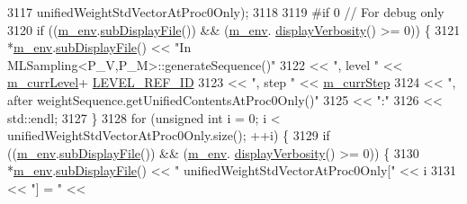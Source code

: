 \begin{DoxyCode}
3117                                                    unifiedWeightStdVectorAtProc0Only);
3118 
3119 \textcolor{preprocessor}{#if 0 // For debug only}
3120 \textcolor{preprocessor}{}      \textcolor{keywordflow}{if} ((\hyperlink{class_q_u_e_s_o_1_1_m_l_sampling_a13f1ca4fe9f94822fe572a743eaced1d}{m\_env}.\hyperlink{class_q_u_e_s_o_1_1_base_environment_a8a0064746ae8dddfece4229b9ad374d6}{subDisplayFile}()) && (\hyperlink{class_q_u_e_s_o_1_1_m_l_sampling_a13f1ca4fe9f94822fe572a743eaced1d}{m\_env}.
      \hyperlink{class_q_u_e_s_o_1_1_base_environment_a1fe5f244fc0316a0ab3e37463f108b96}{displayVerbosity}() >= 0)) \{
3121         *\hyperlink{class_q_u_e_s_o_1_1_m_l_sampling_a13f1ca4fe9f94822fe572a743eaced1d}{m\_env}.\hyperlink{class_q_u_e_s_o_1_1_base_environment_a8a0064746ae8dddfece4229b9ad374d6}{subDisplayFile}() << \textcolor{stringliteral}{"In MLSampling<P\_V,P\_M>::generateSequence()"}
3122                                 << \textcolor{stringliteral}{", level "} << \hyperlink{class_q_u_e_s_o_1_1_m_l_sampling_af9416874c856e50f3b35270e801f17e4}{m\_currLevel}+
      \hyperlink{_m_l_sampling_level_options_8h_a68d15eaf394d210effcf584b938206d3}{LEVEL\_REF\_ID}
3123                                 << \textcolor{stringliteral}{", step "}  << \hyperlink{class_q_u_e_s_o_1_1_m_l_sampling_a1b1f8ccb4823bdfa26ec652f0807c63e}{m\_currStep}
3124                                 << \textcolor{stringliteral}{", after weightSequence.getUnifiedContentsAtProc0Only()"}
3125                                 << \textcolor{stringliteral}{":"}
3126                                 << std::endl;
3127       \}
3128       \textcolor{keywordflow}{for} (\textcolor{keywordtype}{unsigned} \textcolor{keywordtype}{int} i = 0; i < unifiedWeightStdVectorAtProc0Only.size(); ++i) \{
3129         \textcolor{keywordflow}{if} ((\hyperlink{class_q_u_e_s_o_1_1_m_l_sampling_a13f1ca4fe9f94822fe572a743eaced1d}{m\_env}.\hyperlink{class_q_u_e_s_o_1_1_base_environment_a8a0064746ae8dddfece4229b9ad374d6}{subDisplayFile}()) && (\hyperlink{class_q_u_e_s_o_1_1_m_l_sampling_a13f1ca4fe9f94822fe572a743eaced1d}{m\_env}.
      \hyperlink{class_q_u_e_s_o_1_1_base_environment_a1fe5f244fc0316a0ab3e37463f108b96}{displayVerbosity}() >= 0)) \{
3130           *\hyperlink{class_q_u_e_s_o_1_1_m_l_sampling_a13f1ca4fe9f94822fe572a743eaced1d}{m\_env}.\hyperlink{class_q_u_e_s_o_1_1_base_environment_a8a0064746ae8dddfece4229b9ad374d6}{subDisplayFile}() << \textcolor{stringliteral}{"  unifiedWeightStdVectorAtProc0Only["} << i
3131                                   << \textcolor{stringliteral}{"] = "}                                 << 

\end{DoxyCode}
